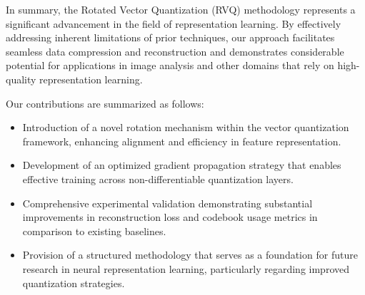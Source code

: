 In summary, the Rotated Vector Quantization (RVQ) methodology represents a significant advancement in the field of representation learning. By effectively addressing inherent limitations of prior techniques, our approach facilitates seamless data compression and reconstruction and demonstrates considerable potential for applications in image analysis and other domains that rely on high-quality representation learning.

Our contributions are summarized as follows:
\begin{itemize}
    \item Introduction of a novel rotation mechanism within the vector quantization framework, enhancing alignment and efficiency in feature representation.
    \item Development of an optimized gradient propagation strategy that enables effective training across non-differentiable quantization layers.
    \item Comprehensive experimental validation demonstrating substantial improvements in reconstruction loss and codebook usage metrics in comparison to existing baselines.
    \item Provision of a structured methodology that serves as a foundation for future research in neural representation learning, particularly regarding improved quantization strategies.
\end{itemize}